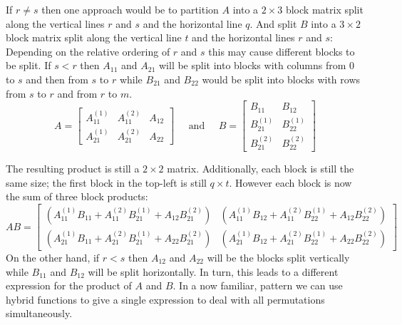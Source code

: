 If $r \neq s$ then one approach would be to partition $A$ into a $2 \times 3$ block matrix 
split along the vertical lines $r$ and $s$ and the horizontal line $q$.
And split $B$ into a $3 \times 2$ block matrix split along the vertical line $t$  and the horizontal lines $r$ and $s$:
Depending on the relative ordering of $r$ and $s$ this may cause different blocks to be split.
If $s < r$ then $A_{11}$ and $A_{21}$ will be split into blocks with columns from 0 to $s$ and then from $s$ to $r$
while $B_{21}$ and $B_{22}$ would be split into blocks with rows from $s$ to $r$ and from $r$ to $m$.
\begin{equation*}
	A= \left[ \begin{array}{cc|c}
			A_{11}^{(1)} & A_{11}^{(2)} & A_{12}^{} \\ 
			\hline
			A_{21}^{(1)} & A_{21}^{(2)} & A_{22}^{}
		\end{array} \right]
	\;\;\;\;\;\text{and}\;\;\;\;\;
	B = \left[ \begin{array}{c|c}
			B_{11}^{} & B_{12}^{} \\
			\hline
			B_{21}^{(1)} & B_{22}^{(1)} \\
			B_{21}^{(2)} & B_{22}^{(2)} 
		\end{array} \right]
\end{equation*}


The resulting product is still a $2 \times 2$ matrix.
Additionally, each block is still the same size; the first block in the top-left is still $q \times t$.
However each block is now the sum of three block products:
\begin{equation*}
	AB 	= 	\begin{bmatrix}
				\left( A_{11}^{(1)}B_{11}^{}+ A_{11}^{(2)}B_{21}^{(1)} + A_{12}^{}B_{21}^{(2)} \right) & 
				\left( A_{11}^{(1)}B_{12}^{}+ A_{11}^{(2)}B_{22}^{(1)} + A_{12}^{}B_{22}^{(2)} \right) \\
				\left( A_{21}^{(1)}B_{11}^{}+ A_{21}^{(2)}B_{21}^{(1)} + A_{22}^{}B_{21}^{(2)} \right) & 
				\left( A_{21}^{(1)}B_{12}^{}+ A_{21}^{(2)}B_{22}^{(1)} + A_{22}^{}B_{22}^{(2)} \right) 
			\end{bmatrix}
\end{equation*}
On the other hand, if $r < s$ then $A_{12}$ and $A_{22}$ will be the blocks split vertically while $B_{11}$ and $B_{12}$
will be split horizontally. 
In turn, this leads to a different expression for the product of $A$ and $B$.
In a now familiar, pattern we can use hybrid functions to give a single expression 
to deal with all permutations simultaneously.


